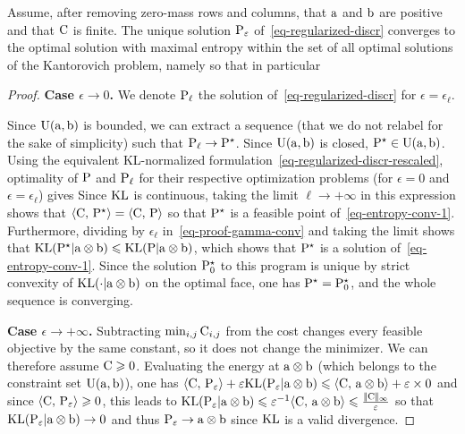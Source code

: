 \begin{prop}\label{prop-convergence-eps}
Assume, after removing zero-mass rows and columns, that $\a$ and $\b$ are positive and that $\C$ is finite.
The unique solution $\P_\epsilon$ of~\eqref{eq-regularized-discr} converges to the optimal solution with maximal entropy within the set of all optimal solutions of the Kantorovich problem, namely
so that in particular
\end{prop}
\begin{proof}
\textbf{Case $\epsilon \rightarrow 0$.}
We denote $\P_\ell$ the solution of~\eqref{eq-regularized-discr} for $\epsilon=\epsilon_\ell$.

Since $\CouplingsD(\a,\b)$ is bounded, we can extract a sequence (that we do not relabel for the sake of simplicity) such that $\P_\ell \rightarrow \P^\star$. Since $\CouplingsD(\a,\b)$ is closed, $\P^\star \in \CouplingsD(\a,\b)$. Using the equivalent KL-normalized formulation~\eqref{eq-regularized-discr-rescaled}, optimality of $\P$ and $\P_\ell$ for their respective optimization problems (for $\epsilon=0$ and $\epsilon=\epsilon_\ell$) gives
Since $\KLD$ is continuous, taking the limit $\ell \rightarrow +\infty$ in this expression shows that
$\dotp{\C}{\P^\star} = \dotp{\C}{\P}$ so that $\P^\star$ is a feasible point of~\eqref{eq-entropy-conv-1}. Furthermore, dividing by $\epsilon_\ell$ in~\eqref{eq-proof-gamma-conv} and taking the limit shows that
$\KLD(\P^\star|\a \otimes \b) \leq \KLD(\P|\a \otimes \b)$, which shows that $\P^\star$ is a solution of~\eqref{eq-entropy-conv-1}. Since the solution $\P_0^\star$ to this program is unique by strict convexity of $\KLD(\cdot|\a \otimes \b)$ on the optimal face, one has $\P^\star = \P_0^\star$, and the whole sequence is converging.

\textbf{Case $\epsilon \rightarrow +\infty$.}
Subtracting $\min_{i,j}\C_{i,j}$ from the cost changes every feasible objective by the same constant, so it does not change the minimizer. We can therefore assume $\C\geq0$. Evaluating the energy at $\a \otimes \b$ (which belongs to the constraint set $\CouplingsD(\a,\b)$), one has
\(\dotp{\C}{\P_\epsilon} + \epsilon \KLD(\P_\epsilon|\a \otimes \b) \leq \dotp{\C}{\a \otimes \b} + \epsilon \times 0\)
and since $\dotp{\C}{\P_\epsilon} \geq 0$, this leads to
\(\KLD(\P_\epsilon|\a \otimes \b) \leq \epsilon^{-1} \dotp{\C}{\a \otimes \b} \leq \frac{\norm{\C}_\infty}{\epsilon}\)
so that $\KLD(\P_\epsilon|\a \otimes \b) \rightarrow 0$ and thus $\P_\epsilon \rightarrow \a \otimes \b$ since $\KLD$ is a valid divergence.
\end{proof}
